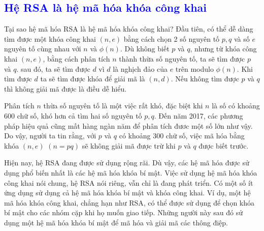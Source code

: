 \textcolor{blue}{\section{Hệ RSA là hệ mã hóa khóa công khai}}
Tại sao hệ mã hóa RSA là hệ mã hóa khóa công khai? Đầu tiên, có thể dễ dàng tìm được một khóa công khai $(n,e)$ bằng cách chọn 2 số nguyên tố $p,q$ và
số $e$ nguyên tố cùng nhau với $n$ và $\phi(n)$. Dù không biết $p$ và $q$, nhưng từ khóa công khai $(n,e)$, bằng cách phân tích $n$ thành thừa số nguyên tố, ta sẽ tìm được $p$ và $q$.
sau đó, ta sẽ tìm được $d$ vì $d$ là nghịch đảo của $e$ trên modulo $\phi(n)$.
Khi tìm được $d$ ta sẽ tìm được khóa để giải mã là $(n,d)$. Nếu không tìm được $p$ và $q$ thì không giải mã được là điều dễ hiểu.

Phân tích $n$ thừa số nguyên tố là một việc rất khó, đặc biệt khi $n$ là số có khoảng 600 chữ số, khó hơn cả tìm hai số nguyên tố $p,q$.
Đến năm 2017, các phương pháp hiệu quả cũng mất hàng ngàn năm để phân tích đươc một số lớn như vậy.
Do vậy, người ta tin rằng, với $p$ và $q$ có khoảng 300 chữ số, việc mã hóa bằng khóa $(n,e)$ $(n=pq)$ sẽ không giải mã được trừ khi $p$ và $q$ được biết trước.

Hiện nay, hệ RSA đang được sử dụng rộng rãi. Dù vậy, các hệ mã hóa
được sử dụng phổ biến nhất là các hệ mã hóa khóa bí mật. Việc sử dụng hệ mã hóa khóa công khai nói chung, hệ RSA nói riêng, vẫn chỉ là đang phát triển.
Có một số ít ứng dụng sử dụng cả hệ mã hóa khóa bí mật và khóa công khai. Ví dụ, một
hệ mã hóa khóa công khai, chẳng hạn như RSA, có thể được sử dụng để chọn khóa bí mật cho các nhóm cặp khi họ muốn giao tiếp. Những người này sau
đó sử dụng một hệ mã hóa khóa bí mật để mã hóa và giải mã các thông điệp.
